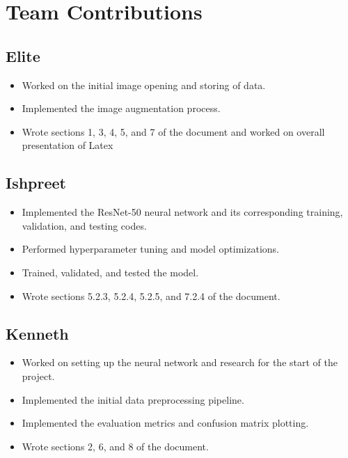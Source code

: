 \documentclass[11pt]{article}
\begin{document}
\section{Team Contributions}

\subsection{Elite}

\begin{itemize}
    \item Worked on the initial image opening and storing of data.
    \item Implemented the image augmentation process.
    \item Wrote sections 1, 3, 4, 5, and 7 of the document and worked on overall presentation of Latex
\end{itemize}

\subsection{Ishpreet}

\begin{itemize}
    \item Implemented the ResNet-50 neural network and its corresponding training, validation, and testing codes.
    \item Performed hyperparameter tuning and model optimizations.
    \item Trained, validated, and tested the model.
    \item Wrote sections 5.2.3, 5.2.4, 5.2.5, and 7.2.4 of the document.
\end{itemize}

\subsection{Kenneth}

\begin{itemize}
    \item Worked on setting up the neural network and research for the start of the project.
    \item Implemented the initial data preprocessing pipeline.
    \item Implemented the evaluation metrics and confusion matrix plotting.
    \item Wrote sections 2, 6, and 8 of the document.
\end{itemize}


\end{document}
